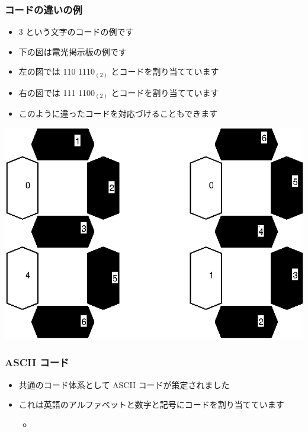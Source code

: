 \begin{frame}
\frametitle{コードの違いの例}
  \begin{itemize}
\item 3 という文字のコードの例です
\item 下の図は電光掲示板の例です
\item 左の図では 110 1110$_{(2)}$ とコードを割り当てています
\item 右の図では 111 1100$_{(2)}$ とコードを割り当てています
\item このように違ったコードを対応づけることもできます
  \end{itemize}
  \begin{example}[電光掲示板の例]
    \begin{center}
\includegraphics[scale=0.5]{./Figure/ComputerLiteracy-figThree.eps}
    \end{center}
  \end{example}
\end{frame}
\begin{frame}
\frametitle{ASCII コード}
  \begin{itemize}
\item 共通のコード体系として ASCII コードが策定されました
\item これは英語のアルファベットと数字と記号にコードを割り当てています
    \begin{itemize}
\item \href{https://en.wikipedia.org/wiki/ASCII\#/media/File:US-ASCII\_code\_chart.png}{}
    \end{itemize}
  \end{itemize}
\end{frame}

